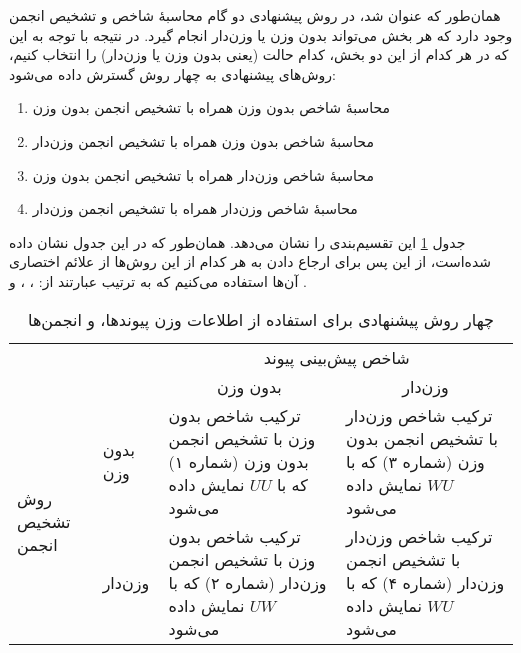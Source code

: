 همان‌طور که عنوان شد، در روش پیشنهادی دو گام محاسبهٔ شاخص و تشخیص انجمن وجود دارد که هر بخش می‌تواند بدون وزن یا وزن‌دار انجام گیرد. در نتیجه با توجه به این که در هر کدام از این دو بخش، کدام حالت (یعنی بدون وزن یا وزن‌دار) را انتخاب کنیم، روش‌های پیشنهادی به چهار روش گسترش داده می‌شود:

{ \onehalfspacing
\begin{enumerate}
  \item محاسبهٔ شاخص بدون وزن همراه با تشخیص انجمن بدون وزن
  \item محاسبهٔ شاخص بدون وزن همراه با تشخیص انجمن وزن‌دار
  \item محاسبهٔ شاخص وزن‌دار همراه با تشخیص انجمن بدون وزن
  \item محاسبهٔ شاخص وزن‌دار همراه با تشخیص انجمن وزن‌دار
\end{enumerate}
}
جدول \ref{tab:3-1} این تقسیم‌بندی را نشان می‌دهد. همان‌طور که در این جدول نشان داده شده‌است، از این پس برای ارجاع دادن به هر کدام از این روش‌ها از علائم اختصاری آن‌ها استفاده می‌کنیم که به ترتیب عبارتند از:
، ،  و .

{ \def\arraystretch{2.0}
\begin{table}[!hb]
  \caption{چهار روش پیشنهادی برای استفاده از اطلاعات وزن پیوندها، و انجمن‌ها}
  \label{tab:3-1}

  \begin{center}
    \begin{tabular}{|m{3cm}|m{2cm}|p{4cm}|p{4cm}|}
      \cline{3-4}
      \multicolumn{2}{c|}{\multirow{2}{*}{}} & \multicolumn{2}{c|}{شاخص پیش‌بینی پیوند} \\ \cline{3-4}
      \multicolumn{2}{c|}{} &
        \multicolumn{1}{c|}{بدون وزن} &
        \multicolumn{1}{c|}{وزن‌دار} \\ \hline
      \multirow{2}{*}{روش تشخیص انجمن} &
        بدون وزن &
        ترکیب شاخص بدون وزن با تشخیص انجمن بدون وزن (شماره ۱) که با $ UU $ نمایش داده می‌شود &
        ترکیب شاخص وزن‌دار با تشخیص انجمن بدون وزن (شماره ۳) که با $ WU $ نمایش داده می‌شود \\ \cline{2-4}
      &
        وزن‌دار &
        ترکیب شاخص بدون وزن با تشخیص انجمن وزن‌دار (شماره ۲) که با $ UW $ نمایش داده می‌شود &
        ترکیب شاخص وزن‌دار با تشخیص انجمن وزن‌دار (شماره ۴) که با $ WU $ نمایش داده می‌شود\\ \hline
    \end{tabular}
  \end{center}
\end{table}
}


